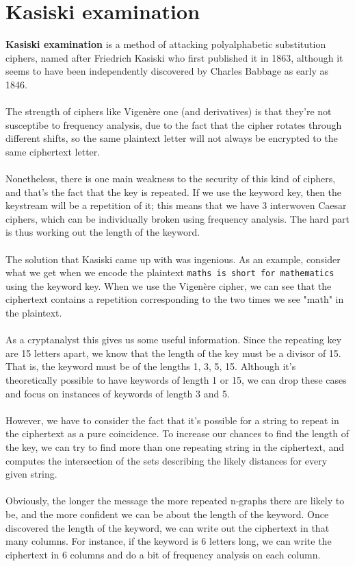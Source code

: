 \documentclass[Lau,binding=0.6cm,oneside]{sapthesis}
\begin{document}
\section{Kasiski examination}
\textbf{Kasiski examination} is a method of attacking polyalphabetic substitution ciphers, named after Friedrich Kasiski who first published it in 1863, although it seems to have been independently discovered by Charles Babbage as early as 1846.\\\\
The strength of ciphers like Vigenère one (and derivatives) is that they're not susceptibe to frequency analysis, due to the fact that the cipher rotates through different shifts, so the same plaintext letter will not always be encrypted to the same ciphertext letter\supercite{kasiski}.\\\\
Nonetheless, there is one main weakness to the security of this kind of ciphers, and that's the fact that the key is repeated. If we use the keyword \textsf{key}, then the keystream will be a repetition of it; this means that we have 3 interwoven Caesar ciphers, which can be individually broken using frequency analysis. The hard part is thus working out the length of the keyword.\\\\
The solution that Kasiski came up with was ingenious. As an example, consider what we get when we encode the plaintext \colorbox{gray!12}{\small{\texttt{maths is short for mathematics}}} using the keyword \textsf{key}. When we use the Vigenère cipher, we can see that the ciphertext contains a repetition corresponding to the two times we see "math" in the plaintext.\\\\
As a cryptanalyst this gives us some useful information. Since the repeating key are 15 letters apart, we know that the length of the key must be a divisor of 15. That is, the keyword must be of the lengths 1, 3, 5, 15. Although it's theoretically possible to have keywords of length 1 or 15, we can drop these cases and focus on instances of keywords of length 3 and 5.\\\\
However, we have to consider the fact that it's possible for a string to repeat in the ciphertext as a pure coincidence. To increase our chances to find the length of the key, we can try to find more than one repeating string in the ciphertext, and computes the intersection of the sets describing the likely distances for every given string.\\\\
Obviously, the longer the message the more repeated n-graphs there are likely to be, and the more confident we can be about the length of the keyword. Once discovered the length of the keyword, we can write out the ciphertext in that many columns. For instance, if the keyword is 6 letters long, we can write the ciphertext in 6 columns and do a bit of frequency analysis on each column\supercite{kasiski_method}.\\\\
\end{document}
